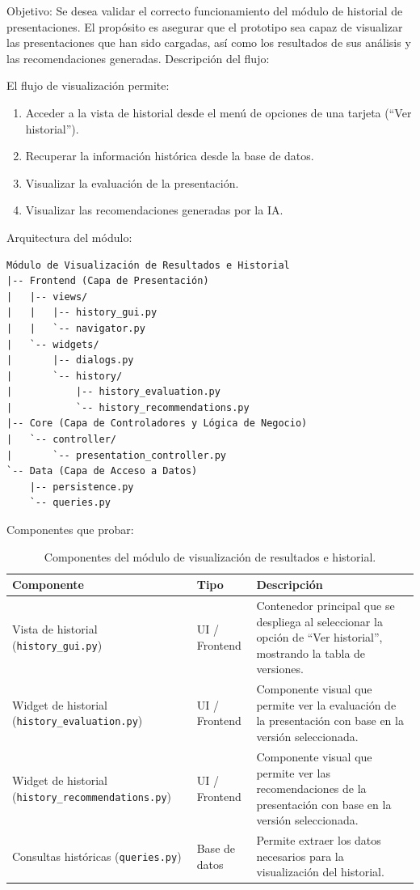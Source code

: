 \documentclass[11pt]{article}
\begin{document}
Objetivo: Se desea validar el correcto funcionamiento del módulo de historial de presentaciones. El propósito es asegurar que el prototipo sea capaz de visualizar las presentaciones que han sido cargadas, así como los resultados de sus análisis y las recomendaciones generadas.
Descripción del flujo:

El flujo de visualización permite:
\begin{enumerate}
    \item Acceder a la vista de historial desde el menú de opciones de una tarjeta (``Ver historial'').
    \item Recuperar la información histórica desde la base de datos.
    \item Visualizar la evaluación de la presentación.
    \item Visualizar las recomendaciones generadas por la IA.
\end{enumerate}

Arquitectura del módulo:
\begin{verbatim}
Módulo de Visualización de Resultados e Historial
|-- Frontend (Capa de Presentación)
|   |-- views/
|   |   |-- history_gui.py
|   |   `-- navigator.py
|   `-- widgets/
|       |-- dialogs.py
|       `-- history/
|           |-- history_evaluation.py
|           `-- history_recommendations.py
|-- Core (Capa de Controladores y Lógica de Negocio)
|   `-- controller/
|       `-- presentation_controller.py
`-- Data (Capa de Acceso a Datos)
    |-- persistence.py
    `-- queries.py
\end{verbatim}

\newpage
Componentes que probar:

\begin{table}[H]
    \centering
    \begin{tabular}{|L{0.34\textwidth}|L{0.18\textwidth}|L{0.38\textwidth}|}
        \hline
        \textbf{Componente} & \textbf{Tipo} & \textbf{Descripción} \\ \hline
        Vista de historial (\texttt{history\_gui.py}) & UI / Frontend & Contenedor principal que se despliega al seleccionar la opción de ``Ver historial'', mostrando la tabla de versiones. \\ \hline
        Widget de historial (\texttt{history\_evaluation.py}) & UI / Frontend & Componente visual que permite ver la evaluación de la presentación con base en la versión seleccionada. \\ \hline
        Widget de historial (\texttt{history\_recommendations.py}) & UI / Frontend & Componente visual que permite ver las recomendaciones de la presentación con base en la versión seleccionada. \\ \hline
        Consultas históricas (\texttt{queries.py}) & Base de datos & Permite extraer los datos necesarios para la visualización del historial. \\ \hline
    \end{tabular}
    \caption{Componentes del módulo de visualización de resultados e historial.}
    \label{tab:componentes-modulo-historial}
\end{table}
\end{document}
